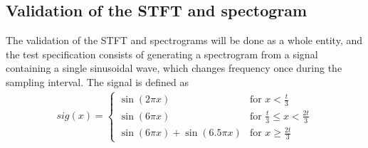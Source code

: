 \subsection{Validation of the STFT and spectogram}
The validation of the STFT and spectrograms will be done as a whole entity, and the test specification consists of generating a spectrogram from a signal containing a single sinusoidal wave, which changes frequency once during the sampling interval. The signal is defined as
\begin{align}\label{eq:SPECTROsignal}
sig(x)=\begin{cases}\sin(2\pi x)&\text{for }x<\frac{t}{3}\\
\sin(6\pi x)&\text{for }\frac{t}{3}\leq x < \frac{2t}{3}\\
\sin(6\pi x)+\sin(6.5\pi x)&\text{for }x\geq\frac{2t}{3}
\end{cases}
\end{align}

